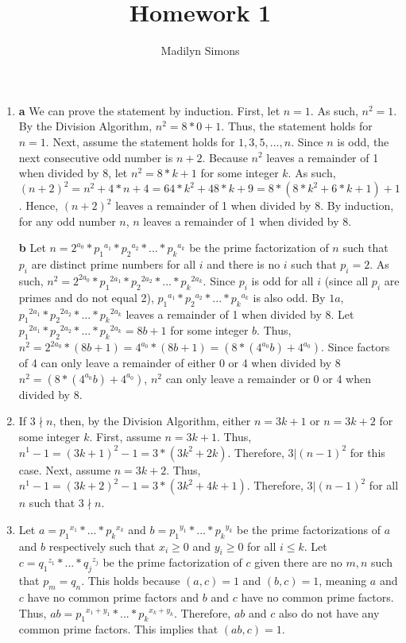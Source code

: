 \documentclass{article}
\title{Homework 1}
\author{Madilyn Simons}
\date{}
\begin{document}
\maketitle

\begin{enumerate}

\item \textbf{a} We can prove the statement by induction.  First, let $n = 1$.  As such, $n^2 = 1$.  By the Division Algorithm, $n^2 = 8*0 + 1$.  Thus, the statement holds for $n = 1$.  Next, assume the statement holds for $1, 3, 5, ..., n$.  Since $n$ is odd, the next consecutive odd number is $n+2$.  Because $n^2$ leaves a remainder of 1 when divided by 8, let $n^2 = 8*k + 1$ for some integer $k$.  As such, $(n+2)^2 = n^2 + 4*n + 4 = 64*k^2 + 48*k + 9 = 8 * (8*k^2 + 6*k + 1) + 1$.  Hence, $(n+2)^2$ leaves a remainder of 1 when divided by 8.  By induction, for any odd number $n$, $n$ leaves a remainder of 1 when divided by 8.

\textbf{b} Let $n = 2^{a_0} * {p_1}^{a_1} * {p_2}^{a_2} * ... * {p_k}^{a_k}$ be the prime factorization of $n$ such that $p_i$ are distinct prime numbers for all $i$ and there is no $i$ such that $p_i = 2$.  As such, $n^2 = 2^{2a_0} * {p_1}^{2a_1} * {p_2}^{2a_2} * ... * {p_k}^{2a_k}$.  Since $p_i$ is odd for all $i$ (since all $p_i$ are primes and do not equal 2), ${p_1}^{a_1} * {p_2}^{a_2} * ... * {p_k}^{a_k}$ is also odd.  By $1a$, ${p_1}^{2a_1} * {p_2}^{2a_2} * ... * {p_k}^{2a_k}$ leaves a remainder of 1 when divided by 8.  Let ${p_1}^{2a_1} * {p_2}^{2a_2} * ... * {p_k}^{2a_k} = 8b + 1$ for some integer $b$.  Thus, $n^2 = 2^{2a_0} * (8b + 1) = 4^{a_0} * (8b + 1) = (8 * (4^{a_0}b) + 4^{a_0}).$  Since factors of 4 can only leave a remainder of either 0 or 4 when divided by 8 $n^2 = (8 * (4^{a_0}b) + 4^{a_0})$, $n^2$ can only leave a remainder or 0 or 4 when divided by 8.

\item If $3 \nmid n$, then, by the Division Algorithm, either $n = 3k + 1$ or $n = 3k + 2$ for some integer $k$.  First, assume $n = 3k + 1$.  Thus, $n^1 - 1 = (3k + 1)^2 - 1 = 3 * (3k^2 + 2k)$.  Therefore, $3 \vert (n - 1)^2$ for this case.  Next, assume $n = 3k + 2$.  Thus, $n^1 - 1 = (3k + 2)^2 - 1 = 3 * (3k^2 + 4k + 1)$.  Therefore, $3 \vert (n - 1)^2$ for all $n$ such that $3 \nmid n$.

\item Let $a = {p_1}^{x_1} * ... * {p_k}^{x_k}$ and $b = {p_1}^{y_1} * ... * {p_k}^{y_k}$ be the prime factorizations of $a$ and $b$ respectively such that $x_i \geq 0$ and $y_i \geq 0$ for all $i \leq k$.  Let $c = {q_1}^{z_1} * ... * {q_j}^{z_j}$ be the prime factorization of $c$ given there are no $m, n$ such that $p_m = q_n$.  This holds because $(a, c) = 1$ and $(b, c) = 1$, meaning $a$ and $c$ have no common prime factors and $b$ and $c$ have no common prime factors.  Thus, $ab = {p_1}^{x_1 + y_1} * ... * {p_k}^{x_k + y_k}$.  Therefore, $ab$ and $c$ also do not have any common prime factors.  This implies that $(ab, c) = 1$.


\end{enumerate}
\end{document}
